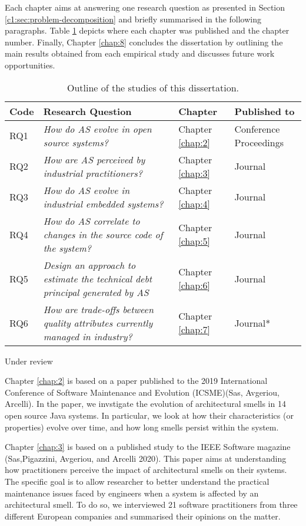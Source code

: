 Each chapter aims at answering one research question as presented in Section \ref{c1:sec:problem-decomposition} and briefly summarised in the following paragraphs.
Table \ref{c1:tab:outline} depicts where each chapter was published and the chapter number.
Finally, Chapter \ref{chap:8} concludes the dissertation by outlining the main results obtained from each empirical study and discusses future work opportunities.

\begin{table}[]
    \centering
    \caption{Outline of the studies of this dissertation.}
    \label{c1:tab:outline}
    \begin{tabular}{lm{6.5cm}lm{2cm}}
    \hline
    \textbf{Code} & \textbf{Research Question} & \textbf{Chapter} & \textbf{Published to} \\ \hline
    RQ1 & \textit{How do AS evolve in open source systems?} &  Chapter \ref{chap:2} & Conference Proceedings \\
    RQ2 & \textit{How are AS perceived by industrial practitioners?} & Chapter \ref{chap:3} & Journal \\
    RQ3 & \textit{How do AS evolve in industrial embedded systems?} &  Chapter \ref{chap:4} & Journal \\
    RQ4 & \textit{How do AS correlate to changes in the source code of the system?} &  Chapter \ref{chap:5} & Journal \\
    RQ5 & \textit{Design an approach to estimate the technical debt principal generated by AS} &  Chapter \ref{chap:6} & Journal \\
    RQ6 & \textit{How are trade-offs between quality attributes currently managed in industry?} & Chapter \ref{chap:7} & Journal* \\ \hline
    \end{tabular}
    {\footnotesize*Under review}
\end{table}

Chapter \ref{chap:2} is based on a paper published to the 2019 International Conference of Software Maintenance and Evolution (ICSME)(Sas, Avgeriou, Arcelli).
In the paper, we invstigate the evolution of architectural smells in 14 open source Java systems.
In particular, we look at how their characteristics (or properties) evolve over time, and how long smells persist within the system. 

Chapter \ref{chap:3} is based on a published study to the IEEE Software magazine (Sas,Pigazzini, Avgeriou, and Arcelli 2020).
This paper aims at understanding how practitioners perceive the impact of architectural smells on their systems.
The specific goal is to allow researcher to better understand the practical maintenance issues faced by engineers when a system is affected by an architectural smell.
To do so, we interviewed 21 software practitioners from three different European companies and summarised their opinions on the matter.

